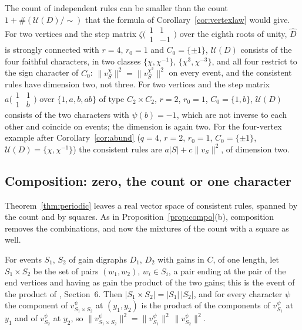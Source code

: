 The count of independent rules can be smaller than the count $1+\#(\mathcal{U}(D)/\!\sim)$ that the formula of Corollary~\ref{cor:vertexlaw} would give. For two vertices and the step matrix $\zeta\bigl(\begin{smallmatrix}1&1\\1&-1\end{smallmatrix}\bigr)$ over the eighth roots of unity, $\hat D$ is strongly connected with $r=4$, $r_0=1$ and $C_0=\{\pm1\}$, $\mathcal{U}(D)$ consists of the four faithful characters, in two classes $\{\chi,\chi^{-1}\}$, $\{\chi^3,\chi^{-3}\}$, and all four restrict to the sign character of $C_0$: $\lVert v^{\chi}_S\rVert^2=\lVert v^{\chi^3}_S\rVert^2$ on every event, and the consistent rules have dimension two, not three. For two vertices and the step matrix $a\bigl(\begin{smallmatrix}1&1\\1&b\end{smallmatrix}\bigr)$ over $\{1,a,b,ab\}$ of type $C_2\times C_2$, $r=2$, $r_0=1$, $C_0=\{1,b\}$, $\mathcal{U}(D)$ consists of the two characters with $\psi(b)=-1$, which are not inverse to each other and coincide on events; the dimension is again two. For the four-vertex example after Corollary~\ref{cor:abund} ($q=4$, $r=2$, $r_0=1$, $C_0=\{\pm1\}$, $\mathcal{U}(D)=\{\chi,\chi^{-1}\}$) the consistent rules are $a|S|+c\lVert v_S\rVert^2$, of dimension two.

\subsection{Composition: zero, the count or one character}
Theorem~\ref{thm:periodic} leaves a real vector space of consistent rules, spanned by the count and by squares. As in Proposition~\ref{prop:compo}(b), composition removes the combinations, and now the mixtures of the count with a square as well.

For events $S_1$, $S_2$ of gain digraphs $D_1$, $D_2$ with gains in $C$, of one length, let $S_1\times S_2$ be the set of pairs $(w_1,w_2)$, $w_i\in S_i$, a pair ending at the pair of the end vertices and having as gain the product of the two gains; this is the event of the product of \cite{g8}, Section~6. Then $|S_1\times S_2|=|S_1|\,|S_2|$, and for every character $\psi$ the component of $v^\psi_{S_1\times S_2}$ at $(y_1,y_2)$ is the product of the components of $v^\psi_{S_1}$ at $y_1$ and of $v^\psi_{S_2}$ at $y_2$, so $\lVert v^\psi_{S_1\times S_2}\rVert^2=\lVert v^\psi_{S_1}\rVert^2\,\lVert v^\psi_{S_2}\rVert^2$.

